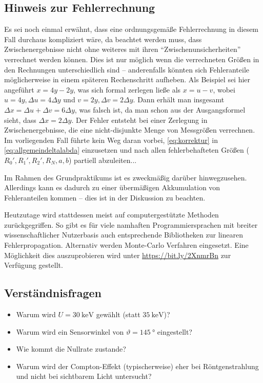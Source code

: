 \documentclass[ngerman,a4paper,twocolumn,twoside]{scrartcl}
\begin{document}
\subsection*{Hinweis zur Fehlerrechnung}
Es sei noch einmal erwähnt, dass eine ordnungsgemäße Fehlerrechnung in diesem Fall durchaus kompliziert wäre, da beachtet werden muss, dass Zwischenergebnisse nicht ohne weiteres mit ihren \enquote{Zwischenunsicherheiten} verrechnet werden können. Dies ist nur möglich wenn die verrechneten Größen in den Rechnungen unterschiedlich sind -- anderenfalls könnten sich Fehleranteile möglicherweise in einem späteren Rechenschritt aufheben. Als Beispiel sei hier angeführt $x=4y-2y$, was sich formal zerlegen ließe als $x=u-v$, wobei $u=4y, \Delta u=4\Delta y$ und $v=2y, \Delta v=2\Delta y$. Dann erhält man insgesamt $\Delta x = \Delta u + \Delta v=6\Delta y$, was falsch ist, da man schon aus der Ausgangsformel sieht, dass $\Delta x=2\Delta y$. Der Fehler entsteht bei einer Zerlegung in Zwischenergebnisse, die eine nicht-disjunkte Menge von Messgrößen verrechnen. Im vorliegenden Fall führte kein Weg daran vorbei, \cref{eq:korrektur} in \cref{eq:allgemeindeltalabda} einzusetzen und nach allen fehlerbehafteten Größen ($R_0',R_1',R_2',R_N,a,b$) partiell abzuleiten...
\par
Im Rahmen des Grundpraktikums ist es zweckmäßig darüber hinwegzusehen. Allerdings kann es dadurch zu einer übermäßigen Akkumulation von Fehleranteilen kommen -- dies ist in der Diskussion zu beachten.
\par
Heutzutage wird stattdessen meist auf computergestützte Methoden zurückgegriffen. So gibt es für viele namhaften Programmiersprachen mit breiter wissenschaftlicher Nutzerbasis auch entsprechende Bibliotheken zur linearen Fehlerpropagation. Alternativ werden Monte-Carlo Verfahren eingesetzt. Eine Möglichkeit dies auszuprobieren wird unter \url{https://bit.ly/2XnmrBn} zur Verfügung gestellt.
\subsection*{Verständnisfragen}
\begin{itemize}
\item Warum wird $U=\SI{30}{\kilo\electronvolt}$ gewählt (statt $\SI{35}{\kilo\electronvolt}$)?
\item Warum wird ein Sensorwinkel von $\vartheta=\SI{145}{\degree}$ eingestellt?
\item Wie kommt die Nullrate zustande?
\item Warum wird der Compton-Effekt (typischerweise) eher bei Röntgenstrahlung und nicht bei sichtbarem Licht untersucht?
\end{itemize}
\end{document}
